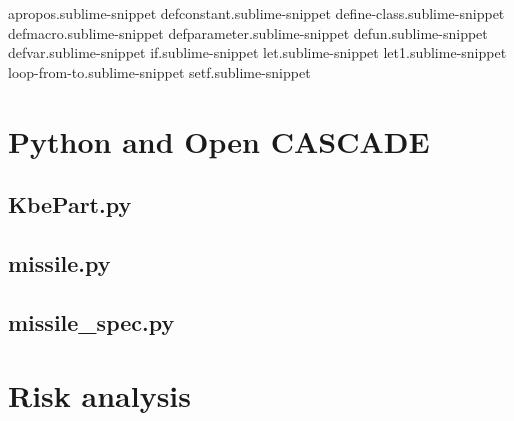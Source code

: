 apropos.sublime-snippet
% 
defconstant.sublime-snippet
% 
define-class.sublime-snippet
% 
defmacro.sublime-snippet
% 
defparameter.sublime-snippet
% 
defun.sublime-snippet
% 
defvar.sublime-snippet
% 
if.sublime-snippet
% 
let.sublime-snippet
% 
let1.sublime-snippet
% 
loop-from-to.sublime-snippet
% 
setf.sublime-snippet
% 



\section{Python and Open CASCADE} %
\label{sec:python_and_open_cascade}


\subsection{KbePart.py}
\label{app:kbepart.py}

\subsection{missile.py}
\label{app:missile.py}

\subsection{missile\_spec.py}
\label{app:missile_spec.py}

\section{Risk analysis} %
\label{sec:risk_analysis}

